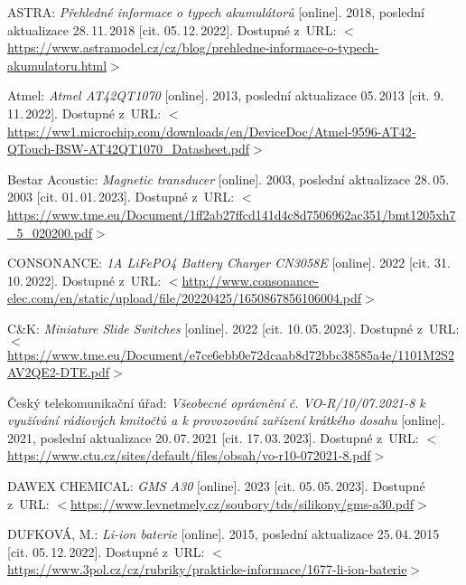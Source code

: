 \begin{thebibliography}{99}

    ASTRA:
    \emph{Přehledné informace o typech akumulátorů}\/ [online].
    2018, poslední aktualizace 28.\,11.\,2018 [cit. 05.\,12.\,2022].
    Dostupné z~URL:
    \(<\)\url{https://www.astramodel.cz/cz/blog/prehledne-informace-o-typech-akumulatoru.html}\(>\)

    Atmel:
    \emph{Atmel AT42QT1070}\/ [online].
    2013, poslední aktualizace 05.\,2013 [cit. 9.\,11.\,2022].
    Dostupné z~URL: 
    \(<\)\url{https://ww1.microchip.com/downloads/en/DeviceDoc/Atmel-9596-AT42-QTouch-BSW-AT42QT1070_Datasheet.pdf}\(>\)

    Bestar Acoustic:
    \emph{Magnetic transducer}\/ [online].
    2003, poslední aktualizace 28.\,05.\,2003 [cit. 01.\,01.\,2023]. 
    Dostupné z~URL:
    \(<\)\url{https://www.tme.eu/Document/1ff2ab27ffcd141d4c8d7506962ac351/bmt1205xh7_5_020200.pdf}\(>\)

    CONSONANCE:
    \emph{1A LiFePO4 Battery Charger CN3058E}\/ [online].
    2022 [cit. 31.\,10.\,2022].
    Dostupné z~URL: %
    \(<\)\url{http://www.consonance-elec.com/en/static/upload/file/20220425/1650867856106004.pdf}\(>\)

    C\&K:
    \emph{Miniature Slide Switches}\/ [online].
    2022 [cit. 10.\,05.\,2023].
    Dostupné z~URL: %
    \(<\)\url{https://www.tme.eu/Document/e7ce6ebb0e72dcaab8d72bbc38585a4e/1101M2S2AV2QE2-DTE.pdf}\(>\)

    Český telekomunikační úřad:
    \emph{Všeobecné oprávnění č. VO-R/10/07.2021-8 k využívání rádiových kmitočtů a k provozování zařízení krátkého dosahu}\/ [online].
    2021, poslední aktualizace 20.\,07.\,2021 [cit. 17.\,03.\,2023].
    Dostupné z~URL:
    \(<\)\url{https://www.ctu.cz/sites/default/files/obsah/vo-r10-072021-8.pdf}\(>\)

    DAWEX CHEMICAL:
    \emph{GMS A30}\/ [online].
    2023 [cit. 05.\,05.\,2023].
    Dostupné z~URL:
    \(<\)\url{https://www.levnetmely.cz/soubory/tds/silikony/gms-a30.pdf}\(>\)


    DUFKOVÁ, M.:
    \emph{Li-ion baterie}\/ [online].
    2015, poslední aktualizace 25.\,04.\,2015 [cit. 05.\,12.\,2022].
    Dostupné z~URL:
    \(<\)\url{https://www.3pol.cz/cz/rubriky/prakticke-informace/1677-li-ion-baterie}\(>\)


\end{thebibliography}
